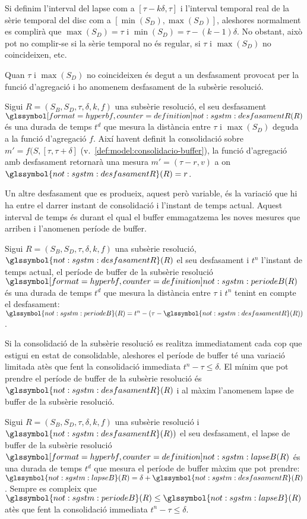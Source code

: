 Si definim l'interval del lapse com a $[\tau - k\delta, \tau]$
i l'interval temporal real de la sèrie temporal del disc com a
$[\min(S_D),\max(S_D)]$, aleshores normalment es complirà que
$\max(S_D)=\tau$ i $\min(S_D)=\tau - (k-1)\delta$. No obstant, això
pot no complir-se si la sèrie temporal no és regular, si $\tau$ i
$\max(S_D)$ no coincideixen, etc. 

Quan $\tau$ i $\max(S_D)$ no coincideixen és degut a un desfasament
provocat per la funció d'agregació i ho anomenem desfasament de la
subsèrie resolució.
\begin{definition} %
  \label{def:sgstm:desdsamentR}
  Sigui $R=(S_B,S_D,\tau,\delta,k,f)$ una subsèrie resolució, el seu
  desfasament $\glssymboldef{not:sgstm:desfasamentR}(R)$ és una durada de
  temps $t^d$ que mesura la distància entre $\tau$ i $\max(S_D)$
  deguda a la funció d'agregació $f$. Així havent definit la
  consolidació sobre $m'=f(S,[\tau,\tau+\delta]$
  (v.~\autoref{def:model:consolidacio-buffer}), la funció d'agregació
  amb desfasament retornarà una mesura $m'=(\tau - r,v)$ a on
  $\glssymbol{not:sgstm:desfasamentR}(R) = r$.
\end{definition}


Un altre desfasament que es produeix, aquest però variable, és la
variació que hi ha entre el darrer instant de consolidació i l'instant
de temps actual. Aquest interval de temps és durant el qual el buffer
emmagatzema les noves mesures que arriben i l'anomenen període de
buffer.
\begin{definition}
  Sigui $R=(S_B,S_D,\tau,\delta,k,f)$ una subsèrie resolució,
  $\glssymbol{not:sgstm:desfasamentR}(R)$ el seu desfasament i $t^n$
  l'instant de temps actual, el període de buffer de la subsèrie
  resolució $\glssymboldef{not:sgstm:periodeB}(R)$ és una durada de temps
  $t^d$ que mesura la distància entre $\tau$ i $t^n$ tenint en compte
  el desfasament: $\glssymbol{not:sgstm:periodeB}(R) = t^n - (\tau -
  \glssymbol{not:sgstm:desfasamentR}(R))$.
\end{definition}

Si la consolidació de la subsèrie resolució es realitza immediatament
cada cop que estigui en estat de consolidable, aleshores el període de
buffer té una variació limitada atès que fent la consolidació
immediata $t^n - \tau \leq \delta$. El mínim que pot prendre el
període de buffer de la subsèrie resolució és $\glssymbol{not:sgstm:desfasamentR}(R)$
i al màxim l'anomenem lapse de buffer de la subsèrie resolució.
\begin{definition}
  Sigui $R=(S_B,S_D,\tau,\delta,k,f)$ una subsèrie resolució i
  $\glssymbol{not:sgstm:desfasamentR}(R))$ el seu desfasament, el
  lapse de buffer de la subsèrie resolució
  $\glssymboldef{not:sgstm:lapseB}(R)$ és una durada de temps $t^d$ que
  mesura el període de buffer màxim que pot prendre:
  $\glssymbol{not:sgstm:lapseB}(R) = \delta +
  \glssymbol{not:sgstm:desfasamentR}(R)$.  Sempre es compleix que
  $\glssymbol{not:sgstm:periodeB}(R) \leq
  \glssymbol{not:sgstm:lapseB}(R)$ atès que fent la consolidació
  immediata $t^n - \tau \leq \delta$.
\end{definition}


